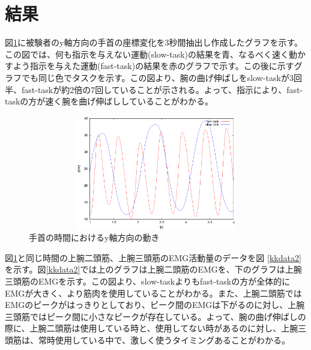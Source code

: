 \documentclass{jsarticle}
\begin{document}

\section{結果}
図\ref{tym3}に被験者のy軸方向の手首の座標変化を3秒間抽出し作成したグラフを示す。この図では、何も指示を与えない運動(slow-task)の結果を青、なるべく速く動かすよう指示を与えた運動(fast-task)の結果を赤のグラフで示す。この後に示すグラフでも同じ色でタスクを示す。この図より、腕の曲げ伸ばしをslow-taskが3回半、fast-taskが約2倍の7回していることが示される。よって、指示により、fast-taskの方が速く腕を曲げ伸ばししていることがわかる。


\begin{figure}[htb]
  \begin{center}
    \includegraphics[width=14cm,height=5cm]{tym3.eps}
    \caption{手首の時間におけるy軸方向の動き}
    \label{tym3}
  \end{center}
\end{figure}


\newpage
図\ref{tym3}と同じ時間の上腕二頭筋、上腕三頭筋のEMG活動量のデータを図%
\ref{kkdata2}を示す。図\ref{kkdata2}では上のグラフは上腕二頭筋のEMGを、下のグラフは上腕三頭筋のEMGを示す。この図より、slow-taskよりもfast-taskの方が全体的にEMGが大きく、より筋肉を使用していることがわかる。また、上腕二頭筋ではEMGのピークがはっきりとしており、ピーク間のEMGは下がるのに対し、上腕三頭筋ではピーク間に小さなピークが存在している。よって、腕の曲げ伸ばしの際に、上腕二頭筋は使用している時と、使用してない時があるのに対し、上腕三頭筋は、常時使用している中で、激しく使うタイミングあることがわかる。
\end{document}
